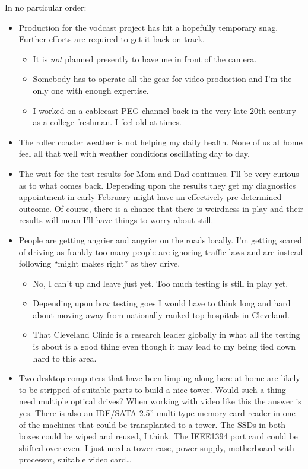 In no particular order:

\begin{itemize}
\tightlist
\item
  Production for the vodcast project has hit a hopefully temporary snag.
  Further efforts are required to get it back on track.

  \begin{itemize}
  \tightlist
  \item
    It is \emph{not} planned presently to have me in front of the
    camera.
  \item
    Somebody has to operate all the gear for video production and I'm
    the only one with enough expertise.
  \item
    I worked on a cablecast PEG channel back in the very late 20th
    century as a college freshman. I feel old at times.
  \end{itemize}
\item
  The roller coaster weather is not helping my daily health. None of us
  at home feel all that well with weather conditions oscillating day to
  day.
\item
  The wait for the test results for Mom and Dad continues. I'll be very
  curious as to what comes back. Depending upon the results they get my
  diagnostics appointment in early February might have an effectively
  pre-determined outcome. Of course, there is a chance that there is
  weirdness in play and their results will mean I'll have things to
  worry about still.
\item
  People are getting angrier and angrier on the roads locally. I'm
  getting scared of driving as frankly too many people are ignoring
  traffic laws and are instead following ``might makes right'' as they
  drive.

  \begin{itemize}
  \tightlist
  \item
    No, I can't up and leave just yet. Too much testing is still in play
    yet.
  \item
    Depending upon how testing goes I would have to think long and hard
    about moving away from nationally-ranked top hospitals in Cleveland.
  \item
    That Cleveland Clinic is a research leader globally in what all the
    testing is about is a good thing even though it may lead to my being
    tied down hard to this area.
  \end{itemize}
\item
  Two desktop computers that have been limping along here at home are
  likely to be stripped of suitable parts to build a nice tower. Would
  such a thing need multiple optical drives? When working with video
  like this the answer is yes. There is also an IDE/SATA 2.5''
  multi-type memory card reader in one of the machines that could be
  transplanted to a tower. The SSDs in both boxes could be wiped and
  reused, I think. The IEEE1394 port card could be shifted over even. I
  just need a tower case, power supply, motherboard with processor,
  suitable video card\ldots{}
\end{itemize}
